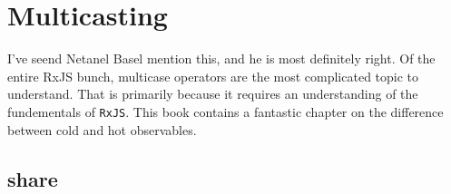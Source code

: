 \chapter{Multicasting}
I've seend Netanel Basel mention this, and he is most definitely right. Of the
entire RxJS bunch, multicase operators are the most complicated topic to 
understand. That is primarily because it requires an understanding of the fundementals of \lstinline{RxJS}. This book contains a fantastic chapter on the difference between cold and hot observables. 


\section{share}
